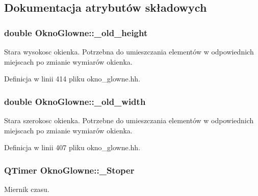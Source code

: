 \subsection{Dokumentacja atrybutów składowych}
\hypertarget{class_okno_glowne_a7dae1b25dbade179eb6dfc30ffeab14b}{
\subsubsection[{\-\_\-old\-\_\-height}]{\setlength{\rightskip}{0pt plus 5cm}double Okno\-Glowne\-::\-\_\-old\-\_\-height\hspace{0.3cm}{\ttfamily [private]}}}\label{class_okno_glowne_a7dae1b25dbade179eb6dfc30ffeab14b}
Stara wysokosc okienka. Potrzebna do umieszczania elementów w odpowiednich miejscach po zmianie wymiarów okienka. 

Definicja w linii 414 pliku okno\-\_\-glowne.\-hh.

\hypertarget{class_okno_glowne_a6a0922607c0970ecdfe8adec7a773c7f}{
\subsubsection[{\-\_\-old\-\_\-width}]{\setlength{\rightskip}{0pt plus 5cm}double Okno\-Glowne\-::\-\_\-old\-\_\-width\hspace{0.3cm}{\ttfamily [private]}}}\label{class_okno_glowne_a6a0922607c0970ecdfe8adec7a773c7f}
Stara szerokosc okienka. Potrzebne do umieszczania elementów w odpowiednich miejscach po zmianie wymiarów okienka. 

Definicja w linii 407 pliku okno\-\_\-glowne.\-hh.

\hypertarget{class_okno_glowne_a5d047f90666212f58e69d11af3285d9b}{
\subsubsection[{\-\_\-\-Stoper}]{\setlength{\rightskip}{0pt plus 5cm}Q\-Timer Okno\-Glowne\-::\-\_\-\-Stoper\hspace{0.3cm}{\ttfamily [private]}}}\label{class_okno_glowne_a5d047f90666212f58e69d11af3285d9b}
Miernik czasu. 

